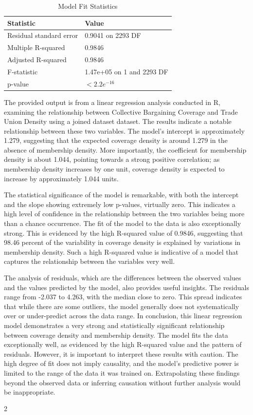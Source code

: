 \documentclass[11pt]{article}\usepackage[]{graphicx}\usepackage[]{xcolor}
\begin{document}
\begin{table}[ht]
\centering
\caption{Model Fit Statistics}
\begin{tabular}{@{}ll@{}}
\toprule
Statistic                       & Value           \\
\midrule
Residual standard error         & 0.9041 on 2293 DF \\
Multiple R-squared              & 0.9846           \\
Adjusted R-squared              & 0.9846           \\
F-statistic                     & 1.47e+05 on 1 and 2293 DF \\
p-value                         & $<2.2e^{-16}$    \\
\bottomrule
\end{tabular}
\label{tab:modelfitstats}
\end{table}
\begin{multicols}{2}
The provided output is from a linear regression analysis conducted in R, examining the relationship between Collective Bargaining Coverage and Trade Union Density using a joined dataset dataset. The results indicate a notable relationship between these two variables. The model's intercept is approximately 1.279, suggesting that the expected coverage density is around 1.279 in the absence of membership density. More importantly, the coefficient for membership density is about 1.044, pointing towards a strong positive correlation; as membership density increases by one unit, coverage density is expected to increase by approximately 1.044 units.

The statistical significance of the model is remarkable, with both the intercept and the slope showing extremely low p-values, virtually zero. This indicates a high level of confidence in the relationship between the two variables being more than a chance occurrence. The fit of the model to the data is also exceptionally strong. This is evidenced by the high R-squared value of 0.9846, suggesting that 98.46 percent of the variability in coverage density is explained by variations in membership density. Such a high R-squared value is indicative of a model that captures the relationship between the variables very well.

The analysis of residuals, which are the differences between the observed values and the values predicted by the model, also provides useful insights. The residuals range from -2.037 to 4.263, with the median close to zero. This spread indicates that while there are some outliers, the model generally does not systematically over or under-predict across the data range. In conclusion, this linear regression model demonstrates a very strong and statistically significant relationship between coverage density and membership density. The model fits the data exceptionally well, as evidenced by the high R-squared value and the pattern of residuals. However, it is important to interpret these results with caution. The high degree of fit does not imply causality, and the model's predictive power is limited to the range of the data it was trained on. Extrapolating these findings beyond the observed data or inferring causation without further analysis would be inappropriate.
\end{multicols}{2}
\end{document}
